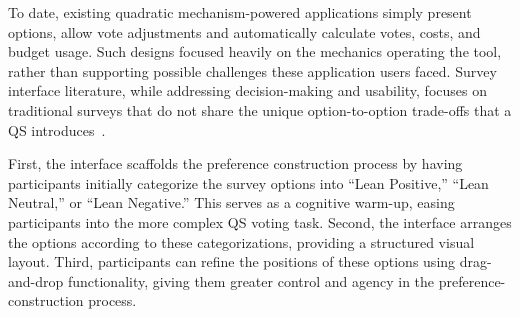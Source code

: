 
To date, existing quadratic mechanism-powered applications simply present options, allow vote adjustments and automatically calculate votes, costs, and budget usage. Such designs focused heavily on the mechanics operating the tool, rather than supporting possible challenges these application users faced. Survey interface literature, while addressing decision-making and usability, focuses on traditional surveys that do not share the unique option-to-option trade-offs that a QS introduces~\cite{engstrom2020politics, weijtersEffectRatingScale2010, kierujVariationsResponseStyle2010, toepoelSmileysStarsHearts2019, farzandAestheticsEvaluatingResponse2024, pielotDidYouMisclick2024}.~


 First, the interface scaffolds the preference construction process by having participants initially categorize the survey options into ``Lean Positive,'' ``Lean Neutral,'' or ``Lean Negative.'' This serves as a cognitive warm-up, easing participants into the more complex QS voting task. Second, the interface arranges the options according to these categorizations, providing a structured visual layout. Third, participants can refine the positions of these options using drag-and-drop functionality, giving them greater control and agency in the preference-construction process. %

